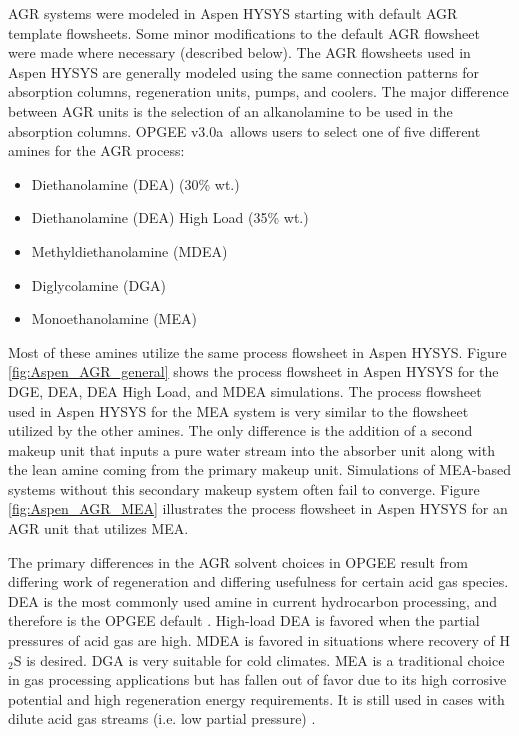 \documentclass[11pt]{report}
\newcommand{\version}{v3.0a}
\begin{document}
AGR systems were modeled in Aspen HYSYS starting with default AGR template flowsheets. Some minor modifications to the default AGR flowsheet were made where necessary (described below). The AGR flowsheets used in Aspen HYSYS are generally modeled using the same connection patterns for absorption columns, regeneration units, pumps, and coolers. The major difference between AGR units is the selection of an alkanolamine to be used in the absorption columns. OPGEE \version \, allows users to select one of five different amines for the AGR process:
\begin{itemize}
 \item Diethanolamine (DEA) (30\% wt.)
\item Diethanolamine (DEA) High Load (35\% wt.)
 \item Methyldiethanolamine (MDEA)
\item Diglycolamine (DGA)
\item Monoethanolamine (MEA)
\end{itemize}
Most of these amines utilize the same process flowsheet in Aspen HYSYS. Figure \ref{fig:Aspen_AGR_general} shows the process flowsheet in Aspen HYSYS for the DGE, DEA, DEA High Load, and MDEA simulations.  The process flowsheet used in Aspen HYSYS for the MEA system is very similar to the flowsheet utilized by the other amines. The only difference is the addition of a second makeup unit that inputs a pure water stream into the absorber unit along with the lean amine coming from the primary makeup unit. Simulations of MEA-based systems without this secondary makeup system often fail to converge. Figure \ref{fig:Aspen_AGR_MEA} illustrates the process flowsheet in Aspen HYSYS for an AGR unit that utilizes MEA.

The primary differences in the AGR solvent choices in OPGEE result from differing work of regeneration and differing usefulness for certain acid gas species. DEA is the most commonly used amine in current hydrocarbon processing, and therefore is the OPGEE default \cite{Manning1991}. High-load DEA is favored when the partial pressures of acid gas are high.  MDEA is favored in situations where recovery of H$_2$S is desired.  DGA is very suitable for cold climates.  MEA is a traditional choice in gas processing applications but has fallen out of favor due to its high corrosive potential and high regeneration energy requirements. It is still used in cases with dilute acid gas streams (i.e. low partial pressure) \cite{Manning1991}.
\end{document}
